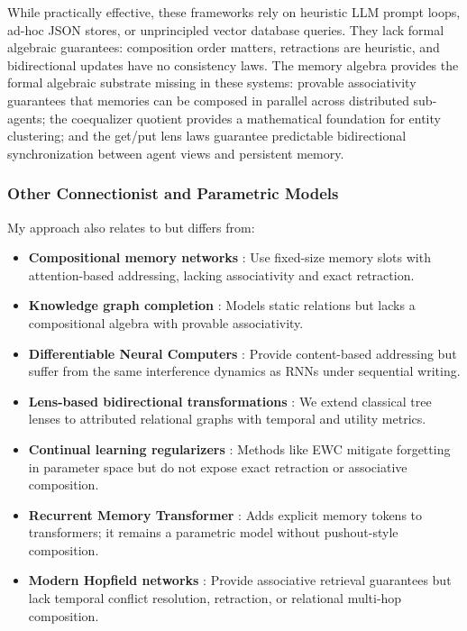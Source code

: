 \documentclass[11pt,a4paper]{article}
\theoremstyle{definition}
\begin{document}
While practically effective, these frameworks rely on heuristic LLM prompt loops, ad-hoc JSON stores, or unprincipled vector database queries. They lack formal algebraic guarantees: composition order matters, retractions are heuristic, and bidirectional updates have no consistency laws. The memory algebra provides the formal algebraic substrate missing in these systems: provable associativity guarantees that memories can be composed in parallel across distributed sub-agents; the coequalizer quotient provides a mathematical foundation for entity clustering; and the get/put lens laws guarantee predictable bidirectional synchronization between agent views and persistent memory.

\subsubsection{Other Connectionist and Parametric Models}
My approach also relates to but differs from:
\begin{itemize}
    \item \textbf{Compositional memory networks} \cite{sukhbaatar2016end}: Use fixed-size memory slots with attention-based addressing, lacking associativity and exact retraction.
    \item \textbf{Knowledge graph completion} \cite{bordes2013translating}: Models static relations but lacks a compositional algebra with provable associativity.
    \item \textbf{Differentiable Neural Computers} \cite{graves2016hybrid}: Provide content-based addressing but suffer from the same interference dynamics as RNNs under sequential writing.
    \item \textbf{Lens-based bidirectional transformations} \cite{foster2007combinators}: We extend classical tree lenses to attributed relational graphs with temporal and utility metrics.
    \item \textbf{Continual learning regularizers} \cite{kirpatrick2017overcoming}: Methods like EWC mitigate forgetting in parameter space but do not expose exact retraction or associative composition.
    \item \textbf{Recurrent Memory Transformer} \cite{bulatov2022recurrent}: Adds explicit memory tokens to transformers; it remains a parametric model without pushout-style composition.
    \item \textbf{Modern Hopfield networks} \cite{ramsauer2021hopfield}: Provide associative retrieval guarantees but lack temporal conflict resolution, retraction, or relational multi-hop composition.
\end{itemize}
\end{document}

